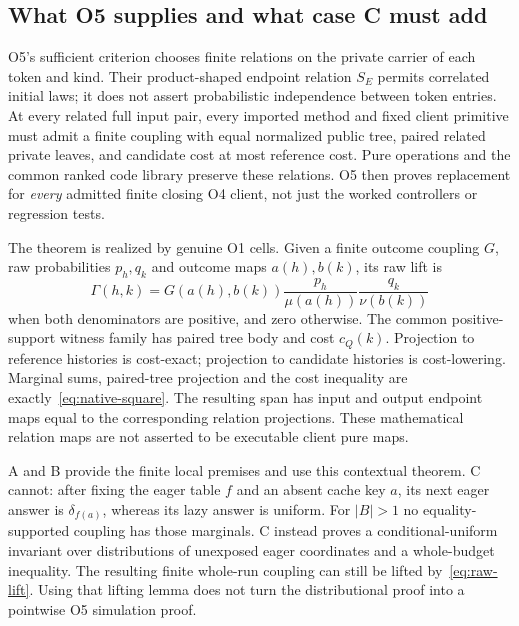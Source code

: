 \documentclass[11pt,a4paper]{article}
\theoremstyle{definition}
\begin{document}
\subsection{What O5 supplies and what case C must add}\label{sec:core-o5}
O5's sufficient criterion chooses finite relations on the private carrier
of each token and kind. Their product-shaped endpoint relation $S_E$
permits correlated initial laws; it does not assert probabilistic
independence between token entries. At every related full input pair,
every imported method and fixed client primitive must admit a finite
coupling with equal normalized public tree, paired related private leaves,
and candidate cost at most reference cost. Pure operations and the common
ranked code library preserve these relations. O5 then proves replacement
for \emph{every} admitted finite closing O4 client, not just the worked
controllers or regression tests.

The theorem is realized by genuine O1 cells. Given a finite outcome
coupling $G$, raw probabilities $p_h,q_k$ and outcome maps $a(h),b(k)$,
its raw lift is
\begin{equation}\label{eq:raw-lift}
\Gamma(h,k)=
G(a(h),b(k))\frac{p_h}{\mu(a(h))}\frac{q_k}{\nu(b(k))}
\end{equation}
when both denominators are positive, and zero otherwise. The common
positive-support witness family has paired tree body and cost $c_Q(k)$.
Projection to reference histories is cost-exact; projection to candidate
histories is cost-lowering. Marginal sums, paired-tree projection and
the cost inequality are exactly~\eqref{eq:native-square}. The resulting
span has input and output endpoint maps equal to the corresponding
relation projections. These mathematical relation maps are not asserted
to be executable client pure maps.

A and B provide the finite local premises and use this contextual theorem.
C cannot: after fixing the eager table $f$ and an absent cache key $a$,
its next eager answer is $\delta_{f(a)}$, whereas its lazy answer is
uniform. For $|B|>1$ no equality-supported coupling has those marginals.
C instead proves a conditional-uniform invariant over distributions of
unexposed eager coordinates and a whole-budget inequality. The resulting
finite whole-run coupling can still be lifted by~\eqref{eq:raw-lift}.
Using that lifting lemma does not turn the distributional proof into a
pointwise O5 simulation proof.
\end{document}
